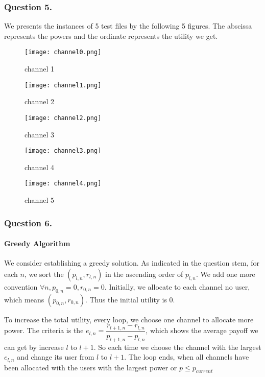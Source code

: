 \documentclass[11pt, oneside]{report}
\begin{document}
\subsubsection{Question 5.}

We presents the instances of 5 test files by the following 5 figures. The abscissa represents the powers and the ordinate represents the utility we get.

\begin{figure}[htbp]
\centering
\begin{minipage}[t]{0.48\textwidth}
\centering
\texttt{[image: channel0.png]}
\caption{channel 1}
\end{minipage}
\begin{minipage}[t]{0.48\textwidth}
\centering
\texttt{[image: channel1.png]}
\caption{channel 2}
\end{minipage}
\centering
\begin{minipage}[t]{0.48\textwidth}
\centering
\texttt{[image: channel2.png]}
\caption{channel 3}
\end{minipage}
\begin{minipage}[t]{0.48\textwidth}
\centering
\texttt{[image: channel3.png]}
\caption{channel 4}
\end{minipage}
\centering
\begin{minipage}[t]{0.48\textwidth}
\centering
\texttt{[image: channel4.png]}
\caption{channel 5}
\end{minipage}
\end{figure}


\subsubsection{Question 6.}
\paragraph{Greedy Algorithm}
We consider establishing a greedy solution. As indicated in the question stem, for each $n$, we sort the $(p_{l,n}, r_{l,n})$ in the ascending order of $p_{l,n}$. We add one more convention $\forall n, p_{0,n} = 0, r_{0,n} = 0 $. Initially, we allocate to each channel no user, which means $(p_{0,n}, r_{0,n})$. Thus the initial utility is 0.

To increase the total utility, every loop, we choose one channel to allocate more power. The criteria is the $e_{l,n} = \dfrac{r_{l+1,n} - r_{l,n}}{p_{l+1,n} - p_{l,n}}$, which shows the average payoff we can get by increase $l$ to $l+1$. So each time we choose the channel with the largest $e_{l,n}$ and change its user from $l$ to $l+1$. The loop ends, when all channels have been allocated with the users with the largest power or $p \leq p_{current}$
\end{document}
